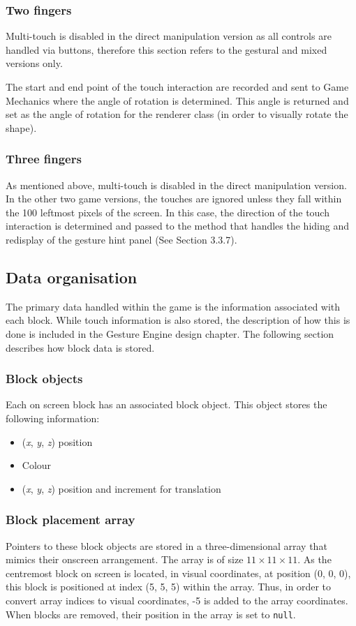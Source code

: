 \subsubsection{Two fingers}
Multi-touch is disabled in the direct manipulation version as all controls are handled via buttons, therefore this section refers to the gestural and mixed versions only.

The start and end point of the touch interaction are recorded and sent to Game Mechanics where the angle of rotation is determined. This angle is returned and set as the angle of rotation for the renderer class (in order to visually rotate the shape).

\subsubsection{Three fingers}
As mentioned above, multi-touch is disabled in the direct manipulation version. In the other two game versions, the touches are ignored unless they fall within the 100 leftmost pixels of the screen. In this case, the direction of the touch interaction is determined and passed to the method that handles the hiding and redisplay of the gesture hint panel (See Section 3.3.7).  

\subsection{Data organisation}
The primary data handled within the game is the information associated with each block. While touch information is also stored, the description of how this is done is included in the Gesture Engine design chapter. The following section describes how block data is stored.

\subsubsection{Block objects}
Each on screen block has an associated block object. This object stores the following information:
\begin{itemize}
\item (\emph{x}, \emph{y}, \emph{z}) position
\item Colour
\item (\emph{x}, \emph{y}, \emph{z}) position and increment for translation
\end{itemize}

\subsubsection{Block placement array}
Pointers to these block objects are stored in a three-dimensional array that mimics their onscreen arrangement. The array is of size $11 \times 11 \times 11$. As the centremost block on screen is located, in visual coordinates, at position (0, 0, 0), this block is positioned at index (5, 5, 5) within the array. Thus, in order to convert array indices to visual coordinates, -5 is added to the array coordinates. When blocks are removed, their position in the array is set to \texttt{null}.


